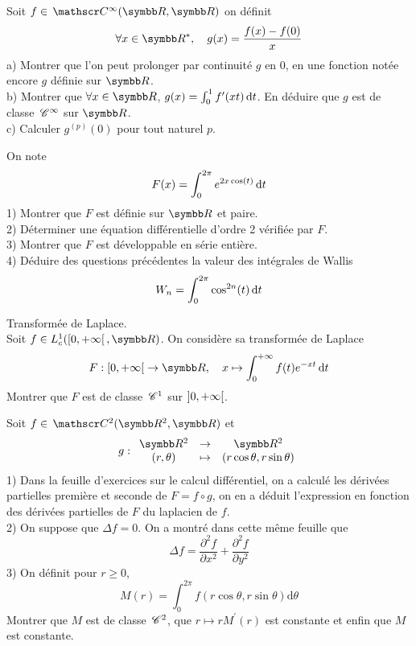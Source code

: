\begin{exercice}
Soit $f\in \mc{\infty}(\R,\R)$ on définit
$$ \forall x\in\R^{*}, \quad g(x)=\frac{f(x)-f(0)}{x} $$
a) Montrer que l'on peut prolonger par continuité $g$ en $0$, en une fonction notée encore $g$ définie sur $\R$. \\
b) Montrer que $\forall x\in\R$, $g(x)=\int_{0}^{1}f^{\prime}(xt)\,\mathrm{d}t$. En déduire que $g$ est de classe $\,\mathscr C^{\infty}$ sur $\R$. \\
c) Calculer $g^{(p)}(0)$ pour tout naturel $p$.
\end{exercice}

\begin{exercice}
On note
$$ F(x)=\int_{0}^{2\pi}e^{2x \cos(t)}\,\mathrm{d}t $$
1) Montrer que $F$ est définie sur $\R$ et paire. \\
2) Déterminer une équation différentielle d'ordre 2 vérifiée par $F$. \\
3) Montrer que $F$ est développable en série entière. \\
4) Déduire des questions précédentes la valeur des intégrales de Wallis
$$ W_{n}=\int_{0}^{2\pi}\cos^{2n}(t)\,\mathrm{d}t $$
\end{exercice}

\begin{exercice}
Transformée de Laplace. \\
Soit $f\in L_{c}^{1}(\interco{0}{+\infty},\R)$. On considère sa transformée de Laplace
$$ F: \interco{0}{+\infty} \to \R, \quad x \mapsto \int_{0}^{+\infty} f(t)e^{-xt}\dt $$
Montrer que $F$ est de classe $\,\mathscr C^{1}$ sur $\left]0, +\infty\right[$.
\end{exercice}

\begin{exercice}
Soit $f\in \mc{2}(\R^{2},\R)$ et
$$ g: \begin{array}{ccc} \R^{2} & \to & \R^{2} \\ (r,\theta) & \mapsto & (r \cos \theta, r \sin \theta) \end{array} $$
1) Dans la feuille d'exercices sur le calcul différentiel, on a calculé les dérivées partielles première et seconde de $F=f\circ g$, on en a déduit l'expression en fonction des dérivées partielles de $F$ du laplacien de $f$. \\
2) On suppose que $\Delta f=0$. On a montré dans cette même feuille que
$$ \Delta f=\frac{\partial^{2}f}{\partial x^{2}}+\frac{\partial^{2}f}{\partial y^{2}} $$
3) On définit pour $r\ge 0$,
$$ M(r)=\int_{0}^{2\pi}f(r \cos \theta, r \sin \theta)\mathrm{d}\theta $$
Montrer que $M$ est de classe $\,\mathscr C^{2}$, que $r\mapsto rM^{\prime}(r)$ est constante et enfin que $M$ est constante.
\end{exercice}


